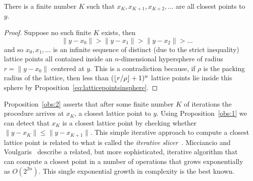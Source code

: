 \documentclass[final,leqno]{siamltex}
\begin{document}

 \begin{proposition}\label{obs:2}
 There is a finite number $K$ such that $x_K, x_{K+1}, x_{K+2}, \dots$ are all closest points to $y$.
 \end{proposition}
 \begin{proof}
Suppose no such finite $K$ exists, then
\[
\|y - x_0\| >  \|y - x_1\| > \|y - x_2\| > \dots
\]
and so $x_0,x_1,\dots$ is an infinite sequence of distinct (due to the strict inequality) lattice points  all contained inside an $n$-dimensional hypersphere of radius $r = \|y - x_0\|$ centered at $y$.  This is a contradiction because, if $\rho$ is the packing radius of the lattice, then less than $({\left\lfloor r/\rho \right\rfloor}+1)^n$ lattice points lie inside this sphere by Proposition~\ref{eq:latticepointsinsphere}. 
\end{proof}
 
Proposition~\ref{obs:2} asserts that after some finite number $K$ of iterations the procedure arrives at $x_K$, a closest lattice point to $y$.  Using Proposition~\ref{obs:1} we can detect that $x_K$ is a closest lattice point by checking whether $\|y - x_K\| \leq \| y - x_{K+1} \|$.
This simple iterative approach to compute a closest lattice point is related to what is called the \emph{iterative slicer}~\cite{Shalvi_iterativeslicer_2009}.  Micciancio and Voulgaris~\cite{MicciancioVoulgaris_deterministic_jv_2013} describe a related, but more sophisticated, iterative algorithm that can compute a closest point in a number of operations that grows exponentially as $O(2^{2 n})$.  This single exponential growth in complexity is the best known.  %
\end{document}
